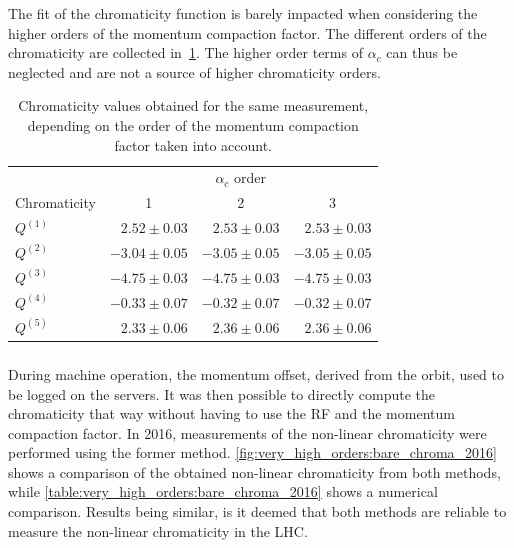 The fit of the chromaticity function is barely impacted when considering the higher orders of the 
momentum compaction factor. The different orders of the chromaticity are collected
in~\cref{table:decapoles:chromaticity:alpha_c_chroma}.
The higher order terms of $\alpha_c$ can thus be neglected and are not a source of higher
chromaticity orders.

\begin{table}[!htb]
    \centering
    \begin{tabular}{lrrr}
      \toprule
                  & \multicolumn{3}{c}{$\alpha_c$ order} \\
      Chromaticity &  \multicolumn{1}{c}{1}  &  \multicolumn{1}{c}{2} &  \multicolumn{1}{c}{3} \\
      \midrule
      $Q^{(1)}$ & $ 2.52 \pm 0.03$ & $ 2.53 \pm 0.03$ & $ 2.53 \pm 0.03$ \\
      $Q^{(2)}$ & $-3.04 \pm 0.05$ & $-3.05 \pm 0.05$ & $-3.05 \pm 0.05$ \\
      $Q^{(3)}$ & $-4.75 \pm 0.03$ & $-4.75 \pm 0.03$ & $-4.75 \pm 0.03$ \\
      $Q^{(4)}$ & $-0.33 \pm 0.07$ & $-0.32 \pm 0.07$ & $-0.32 \pm 0.07$ \\
      $Q^{(5)}$ & $ 2.33 \pm 0.06$ & $ 2.36 \pm 0.06$ & $ 2.36 \pm 0.06$ \\
      \bottomrule
    \end{tabular}
    \caption{Chromaticity values obtained for the same measurement, depending on the order of the
    momentum compaction factor taken into account.}
    \label{table:decapoles:chromaticity:alpha_c_chroma}
\end{table}     

\subsubsection{}

During machine operation, the momentum offset, derived from the orbit, used to be logged on the
servers. It was then possible to directly compute the chromaticity that way without having to use
the RF and the momentum compaction factor.
In 2016, measurements of the non-linear chromaticity were performed using the former method.
\cref{fig:very_high_orders:bare_chroma_2016} shows a comparison of the obtained non-linear 
chromaticity from both methods, while \cref{table:very_high_orders:bare_chroma_2016} shows a
numerical comparison. Results being similar, is it deemed that both methods are reliable to measure
the non-linear chromaticity in the LHC.


